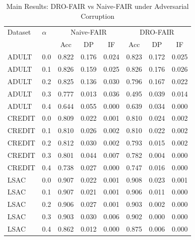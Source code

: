 \begin{table}[htbp]
\centering
\caption{Main Results: DRO-FAIR vs Naive-FAIR under Adversarial Corruption}
\begin{tabular}{ll|ccc|ccc}
\hline
\hline
Dataset & $\alpha$ & \multicolumn{3}{c|}{Naive-FAIR} & \multicolumn{3}{c}{DRO-FAIR} \\
& & Acc & DP & IF & Acc & DP & IF \\
\hline
ADULT & 0.0 & 0.822 & 0.176 & 0.024 & 0.823 & 0.172 & 0.025 \\
ADULT & 0.1 & 0.826 & 0.159 & 0.025 & 0.826 & 0.176 & 0.026 \\
ADULT & 0.2 & 0.825 & 0.136 & 0.030 & 0.796 & 0.167 & 0.022 \\
ADULT & 0.3 & 0.777 & 0.013 & 0.036 & 0.495 & 0.039 & 0.014 \\
ADULT & 0.4 & 0.644 & 0.055 & 0.000 & 0.639 & 0.034 & 0.000 \\
CREDIT & 0.0 & 0.809 & 0.022 & 0.001 & 0.810 & 0.024 & 0.002 \\
CREDIT & 0.1 & 0.810 & 0.026 & 0.002 & 0.810 & 0.022 & 0.002 \\
CREDIT & 0.2 & 0.812 & 0.030 & 0.002 & 0.793 & 0.015 & 0.002 \\
CREDIT & 0.3 & 0.801 & 0.044 & 0.007 & 0.782 & 0.004 & 0.000 \\
CREDIT & 0.4 & 0.738 & 0.027 & 0.000 & 0.747 & 0.016 & 0.000 \\
LSAC & 0.0 & 0.907 & 0.022 & 0.001 & 0.908 & 0.023 & 0.001 \\
LSAC & 0.1 & 0.907 & 0.021 & 0.001 & 0.906 & 0.011 & 0.000 \\
LSAC & 0.2 & 0.906 & 0.027 & 0.001 & 0.903 & 0.002 & 0.000 \\
LSAC & 0.3 & 0.903 & 0.030 & 0.006 & 0.902 & 0.000 & 0.000 \\
LSAC & 0.4 & 0.862 & 0.012 & 0.000 & 0.875 & 0.006 & 0.000 \\
\hline
\end{tabular}
\label{tab:main_results}
\end{table}